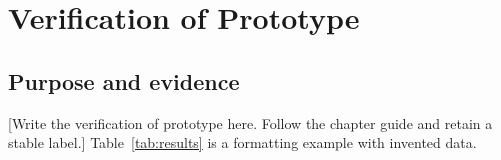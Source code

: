 \chapter{Verification of Prototype}
\label{chap:verification_of_prototype}
\section{Purpose and evidence}
[Write the verification of prototype here. Follow the chapter guide and retain a stable label.]
Table~\ref{tab:results} is a formatting example with invented data.


